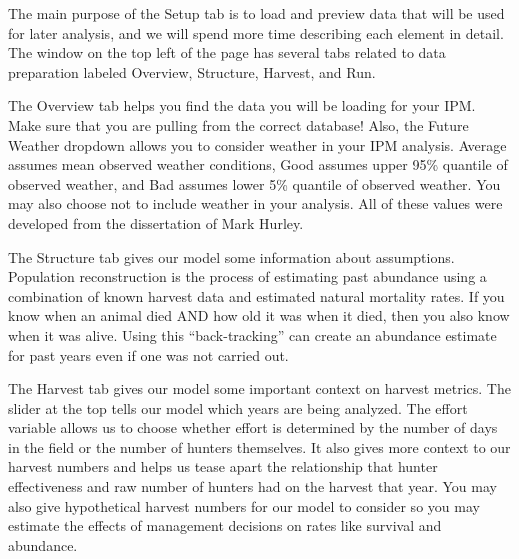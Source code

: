 \documentclass[
]{book}
\begin{document}
The main purpose of the Setup tab is to load and preview data that will be used for later analysis, and we will spend more time describing each element in detail. The window on the top left of the page has several tabs related to data preparation labeled Overview, Structure, Harvest, and Run.

The Overview tab helps you find the data you will be loading for your IPM. Make sure that you are pulling from the correct database! Also, the Future Weather dropdown allows you to consider weather in your IPM analysis. Average assumes mean observed weather conditions, Good assumes upper 95\% quantile of observed weather, and Bad assumes lower 5\% quantile of observed weather. You may also choose not to include weather in your analysis. All of these values were developed from the dissertation of Mark Hurley.

The Structure tab gives our model some information about assumptions. Population reconstruction is the process of estimating past abundance using a combination of known harvest data and estimated natural mortality rates. If you know when an animal died AND how old it was when it died, then you also know when it was alive. Using this ``back-tracking'' can create an abundance estimate for past years even if one was not carried out.

The Harvest tab gives our model some important context on harvest metrics. The slider at the top tells our model which years are being analyzed. The effort variable allows us to choose whether effort is determined by the number of days in the field or the number of hunters themselves. It also gives more context to our harvest numbers and helps us tease apart the relationship that hunter effectiveness and raw number of hunters had on the harvest that year. You may also give hypothetical harvest numbers for our model to consider so you may estimate the effects of management decisions on rates like survival and abundance.
\end{document}
